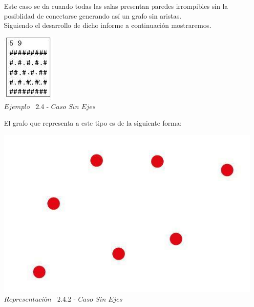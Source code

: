 Este caso se da cuando todas las salas presentan paredes irrompibles sin la posiblidad de conectarse generando as\'i un grafo sin aristas.\\

Siguiendo el desarrollo de dicho informe a continuaci\'on mostraremos.\\
 
\vspace*{0.3cm} \vspace*{0.3cm}
  \begin{center}
 \includegraphics[scale=1.6]{./EJ2/ej2sinejes.jpeg}
\\ {$Ejemplo$ \ 2.4 - $Caso$ $Sin$ $Ejes$}
  \end{center}
  \vspace*{0.3cm}

El grafo que representa a este tipo es de la siguiente forma:\\

\vspace*{0.3cm} \vspace*{0.3cm}
  \begin{center}
 \includegraphics[scale=0.5]{./EJ2/grafoSinEjes.jpeg}
 \\{$Representación$ \ 2.4.2 - $Caso$ $Sin$ $Ejes$}
  \end{center}
  \vspace*{0.3cm}


